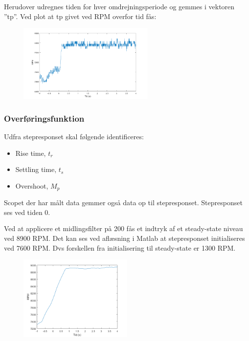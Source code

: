 Herudover udregnes tiden for hver omdrejningsperiode og gemmes i vektoren ”tp”. Ved plot at tp givet ved RPM overfor tid fås:

\begin{figure}[h]
  \centering
  \includegraphics[width=0.6\textwidth]{./figurer/mo3.png}
  \caption{}
  \label{fig:mo3}
\end{figure}

\subsubsection{Overføringsfunktion}

\label{sec:overforingsfunktion}
Udfra stepresponset skal følgende identificeres:

\begin{itemize}
\item Rise time, $t_r$
\item Settling time, $t_s$
\item Overshoot, $M_p$
\end{itemize}

Scopet der har målt data gemmer også data op til stepresponset. Stepresponset ses ved tiden 0.

Ved at applicere et midlingsfilter på 200 fås et indtryk af et steady-state niveau ved 8900 RPM. Det kan ses ved aflæsning i Matlab at stepresponset initialiseres ved 7600 RPM. Dvs forskellen fra initialisering til steady-state er 1300 RPM. 

\begin{figure}[h]
  \centering
  \includegraphics[width=0.5\textwidth]{./figurer/mo4.png}
  \caption{}
  \label{fig:mo4}
\end{figure}

